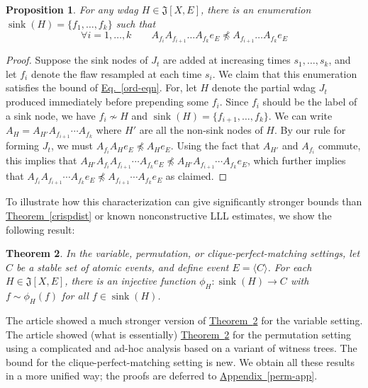 \documentclass[11pt]{article}
\newcommand{\expref}[2]{\texorpdfstring{\hyperref[#2]{#1~\ref{#2}}}{#1~\ref{#2}}}
\newcommand{\expeqref}[2]{\texorpdfstring{\hyperref[#2]{#1~\eqref{#2}}}{#1~\eqref{#2}}}
\newtheorem{theorem}{Theorem}[section]
\newtheorem{proposition}[theorem]{Proposition}
\DeclareMathOperator{\sink}{sink}
\begin{document}
\begin{proposition}
\label{character-prop}
For any wdag $H \in \mathfrak J[X,E]$, there is an enumeration $\sink(H) = \{f_1, \dots, f_ k \}$ such that
\begin{equation}
\label{ord-eqn}
\forall i = 1, \dots, k \qquad A_{f_i} A_{f_{i+1}} \dots A_{f_k} e_E \not \preceq A_{f_{i+1}} \dots A_{f_k} e_E
\end{equation}
\end{proposition}
\begin{proof}
Suppose the sink nodes of $J_t$ are added at increasing times $s_1, \dots, s_k$, and let $f_i$ denote the flaw resampled at each time $s_i$. We claim that this enumeration satisfies the bound of \expeqref{Eq.}{ord-eqn}.  For, let $H$ denote the partial wdag $J_t$ produced immediately before prepending some $f_i$. Since $f_i$ should be the label of a sink node, we have $f_i \not \sim H$ and $\sink(H) = \{f_{i+1}, \dots, f_k \}$. We can write $A_H = A_{H'} A_{f_{i+1}} \cdots A_{f_k}$ where $H'$ are all the non-sink nodes of $H$. By our rule for forming $J_t$, we must $A_{f_i} A_H e_E \not \preceq A_H e_E$. Using the fact that $A_{H'}$ and $A_{f_i}$ commute, this implies that $ A_{H'} A_{f_i} A_{f_{i+1}} \cdots A_{f_k} e_E  \not \preceq A_{H'} A_{f_{i+1}} \cdots A_{f_k} e_E$, which further implies that $A_{f_i} A_{f_{i+1}} \cdots A_{f_k} e_E  \not \preceq  A_{f_{i+1}} \cdots A_{f_k} e_E$ as claimed.
\end{proof}

To illustrate how this characterization can give significantly stronger bounds than \expref{Theorem}{crispdist} or known nonconstructive LLL estimates, we show the following result:
\begin{theorem}
\label{perm-thm}
In  the variable, permutation, or clique-perfect-matching settings, let $C$ be a stable set of atomic events, and define event $E  = \langle C \rangle$. For each $H \in \mathfrak J[X,E]$, there is an injective function $\phi_H: \sink(H) \rightarrow C$ with $f \sim \phi_H(f)$ for all $f \in \sink(H)$.
\end{theorem}


The %
article  %
\cite{LLLLBeyond} showed a much stronger version of \expref{Theorem}{perm-thm} for the variable setting.  The %
article  %
\cite{NewBoundsHarris} showed (what is essentially) \expref{Theorem}{perm-thm} for the permutation setting using a complicated and ad-hoc analysis based on a variant of witness trees. The bound for the clique-perfect-matching setting is new. We obtain all these results in a more unified way; the proofs are deferred to \expref{Appendix}{perm-app}.
\end{document}
